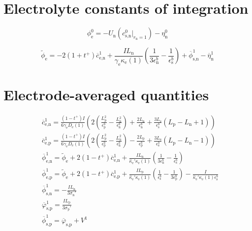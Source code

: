 \documentclass[a4paper]{article}
\newcommand{\ts}[1]{_{\text{#1}}}
\newcommand{\mybar}{\overline}
\begin{document}
\appendix

\section{Electrolyte constants of integration}\label{app:electrolyte-constants}

\begin{equation}
  \phi\ts{e}^0 = - U\ts{n}(c\ts{s,n}^0\big|_{r\ts{n}=1}) - \eta\ts{n}^0
\end{equation}

\begin{equation}
  \tilde{\phi}\ts{e} = - 2(1 + t^+) \mybar{c}\ts{e,n}^1 + \frac{I L\ts{n}}{\gamma\ts{e} \kappa\ts{e}(1)} \left(\frac{1}{3\epsilon\ts{n}^b} - \frac{1}{\epsilon\ts{s}^b}\right)
  + \mybar{\phi}\ts{s,n}^1 - \mybar{\eta}\ts{n}^1
\end{equation}

\section{Electrode-averaged quantities}\label{app:electrode_averaged} 
\begin{align} 	
    \label{eqn:av-c_neg}
	&\mybar{c}\ts{e,n}^1 = \frac{(1-t^+) I}{ 6 \gamma\ts{e} D\ts{e}(1)}\left( 2\left(\frac{L\ts{p}^2}{\epsilon\ts{p}^b} - \frac{L\ts{n}^2}{\epsilon\ts{n}^b} \right) + \frac{2 L\ts{n}}{\epsilon\ts{n}^b} + \frac{3L\ts{s}}{\epsilon\ts{s}^{b}}(L\ts{p}-L\ts{n}+1)\right) \\ 
	\label{eqn:av-c_pos}
    &\mybar{c}\ts{e,p}^1 = \frac{(1-t^+) I}{ 6 \gamma\ts{e} D\ts{e}(1)}\left( 2\left(\frac{L\ts{p}^2}{\epsilon\ts{p}^b} - \frac{L\ts{n}^2}{\epsilon\ts{n}^b} \right) - \frac{2 L\ts{p}}{\epsilon\ts{p}^b} + \frac{3L\ts{s}}{\epsilon\ts{s}^{b}}(L\ts{p}-L\ts{n}-1)\right) \\ 
    &\mybar{\phi}\ts{e,n}^1 = \tilde{\phi}\ts{e} +2(1-t^+) \mybar{c}\ts{e,n}^1 + \frac{ IL\ts{n}}{\hat{\kappa}\ts{e}'\kappa\ts{e}(1)}\left(\frac{1}{3 \epsilon\ts{n}^b} - \frac{1}{\epsilon\ts{s}^b}\right) \\ 
    &\mybar{\phi}\ts{e,p}^1 = \tilde{\phi}\ts{e} +2(1-t^+) \mybar{c}\ts{e,p}^1 + \frac{ IL\ts{p}}{\hat{\kappa}\ts{e}'\kappa\ts{e}(1)}\left(\frac{1}{ \epsilon\ts{s}^b} - \frac{1}{3\epsilon\ts{p}^b}\right) - \frac{I}{\hat{\kappa}\ts{e}'\kappa\ts{e}(1)\epsilon\ts{s}^b} \\
    & \mybar{\phi}\ts{s,n}^1 = -\frac{IL\ts{n}}{3\sigma\ts{n}'} \\
    &\mybar{\varphi}\ts{s,p}^1 = \frac{IL\ts{p}}{3\sigma\ts{p}'} \\
    &\mybar{\phi}\ts{s,p}^1 = \mybar{\varphi}\ts{s,p} + V^1
\end{align} 
\end{document}
